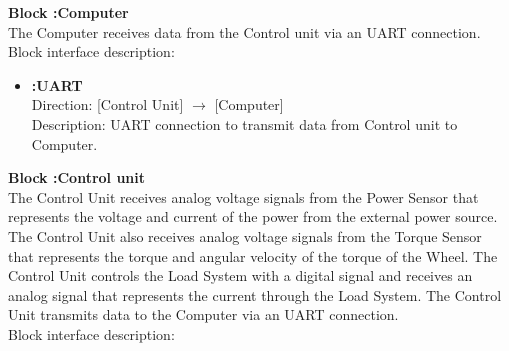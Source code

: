 \textbf{Block :Computer}\\
The Computer receives data from the Control unit via an UART connection.\\
Block interface description:

\begin{itemize}
	\item \textbf{:UART}\\
		Direction: [Control Unit] $\rightarrow$ [Computer]\\
		Description: UART connection to transmit data from Control unit to Computer.
\end{itemize}

\textbf{Block :Control unit}\\
The Control Unit receives analog voltage signals from the Power Sensor that represents the voltage and current of the power from the external power source. The Control Unit also receives analog voltage signals from the Torque Sensor that represents the torque and angular velocity of the torque of the Wheel. The Control Unit controls the Load System with a digital signal and receives an analog signal that represents the current through the Load System. The Control Unit transmits data to the Computer via an UART connection.\\
Block interface description:

